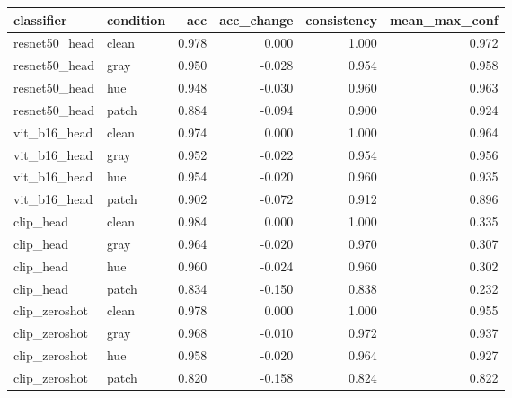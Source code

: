 \begin{tabular}{llrrrr}
\toprule
classifier & condition & acc & acc_change & consistency & mean_max_conf \\
\midrule
resnet50_head & clean & 0.978 & 0.000 & 1.000 & 0.972 \\
resnet50_head & gray & 0.950 & -0.028 & 0.954 & 0.958 \\
resnet50_head & hue & 0.948 & -0.030 & 0.960 & 0.963 \\
resnet50_head & patch & 0.884 & -0.094 & 0.900 & 0.924 \\
vit_b16_head & clean & 0.974 & 0.000 & 1.000 & 0.964 \\
vit_b16_head & gray & 0.952 & -0.022 & 0.954 & 0.956 \\
vit_b16_head & hue & 0.954 & -0.020 & 0.960 & 0.935 \\
vit_b16_head & patch & 0.902 & -0.072 & 0.912 & 0.896 \\
clip_head & clean & 0.984 & 0.000 & 1.000 & 0.335 \\
clip_head & gray & 0.964 & -0.020 & 0.970 & 0.307 \\
clip_head & hue & 0.960 & -0.024 & 0.960 & 0.302 \\
clip_head & patch & 0.834 & -0.150 & 0.838 & 0.232 \\
clip_zeroshot & clean & 0.978 & 0.000 & 1.000 & 0.955 \\
clip_zeroshot & gray & 0.968 & -0.010 & 0.972 & 0.937 \\
clip_zeroshot & hue & 0.958 & -0.020 & 0.964 & 0.927 \\
clip_zeroshot & patch & 0.820 & -0.158 & 0.824 & 0.822 \\
\bottomrule
\end{tabular}
